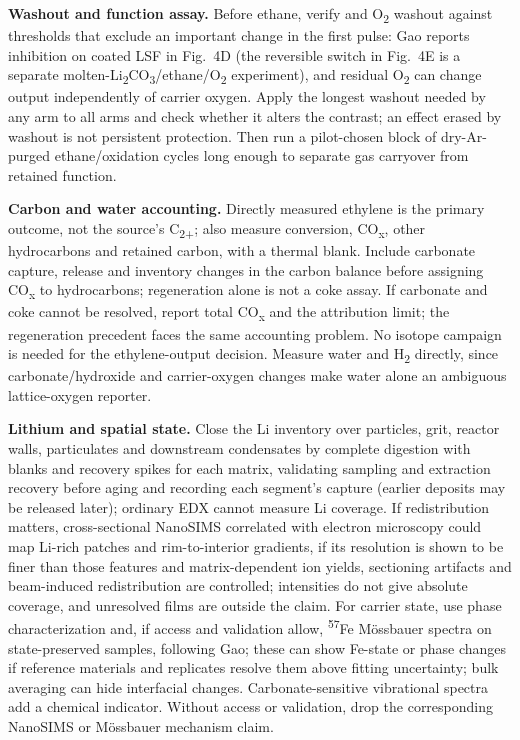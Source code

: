 \textbf{Washout and function assay.} Before ethane, verify \COtwo{} and O\textsubscript{2} washout against thresholds that exclude an important change in the first pulse: Gao reports \COtwo{} inhibition on coated LSF in Fig.~4D (the reversible switch in Fig.~4E is a separate molten-Li\textsubscript{2}CO\textsubscript{3}/ethane/O\textsubscript{2} experiment),\cite{gao2020} and residual O\textsubscript{2} can change output independently of carrier oxygen. Apply the longest washout needed by any arm to all arms and check whether it alters the contrast; an effect erased by washout is not persistent protection. Then run a pilot-chosen block of dry-Ar-purged ethane/oxidation cycles long enough to separate gas carryover from retained function.

\textbf{Carbon and water accounting.} Directly measured ethylene is the primary outcome, not the source's C\textsubscript{2+}; also measure conversion, CO\textsubscript{x}, other hydrocarbons and retained carbon, with a thermal blank. Include carbonate capture, release and inventory changes in the carbon balance before assigning CO\textsubscript{x} to hydrocarbons; regeneration \COtwo{} alone is not a coke assay. If carbonate and coke cannot be resolved, report total CO\textsubscript{x} and the attribution limit; the regeneration precedent faces the same accounting problem.\cite[ch.~4.1]{chacko2025thesis} No isotope campaign is needed for the ethylene-output decision. Measure water and H\textsubscript{2} directly, since carbonate/hydroxide and carrier-oxygen changes make water alone an ambiguous lattice-oxygen reporter.

\textbf{Lithium and spatial state.} Close the Li inventory over particles, grit, reactor walls, particulates and downstream condensates by complete digestion with blanks and recovery spikes for each matrix, validating sampling and extraction recovery before aging and recording each segment's capture (earlier deposits may be released later); ordinary EDX cannot measure Li coverage. If redistribution matters, cross-sectional NanoSIMS correlated with electron microscopy could map Li-rich patches and rim-to-interior gradients, if its resolution is shown to be finer than those features and matrix-dependent ion yields, sectioning artifacts and beam-induced redistribution are controlled; intensities do not give absolute coverage, and unresolved films are outside the claim. For carrier state, use phase characterization and, if access and validation allow, \textsuperscript{57}Fe M\"ossbauer spectra on state-preserved samples, following Gao;\cite{gao2020} these can show Fe-state or phase changes if reference materials and replicates resolve them above fitting uncertainty; bulk averaging can hide interfacial changes. Carbonate-sensitive vibrational spectra add a chemical indicator. Without access or validation, drop the corresponding NanoSIMS or M\"ossbauer mechanism claim.

